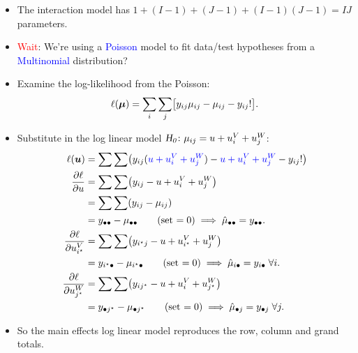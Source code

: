 \documentclass[oneside]{book}\usepackage[]{graphicx}\usepackage[svgnames]{xcolor}
\let\exp\relax%
\let\log\relax%
\newcommand{\HN}{\textsl{H}_{\textsl{0}}}%
\providecommand{\Vector}[1]{\bm{#1}}%
\begin{document}
\begin{itemize}
      \item The interaction model has $ 1+(I-1)+(J-1)+(I-1)(J-1)=IJ $ parameters.
      \item \textcolor{Red}{Wait}: We're using a \textcolor{Blue}{Poisson} model to fit data/test hypotheses from a \textcolor{Blue}{Multinomial} distribution?
      \item Examine the log-likelihood from the Poisson:
            \[ \ell(\Vector{\mu})=\sum_i\sum_j\bigl[y_{ij}\log{\mu_{ij}}-\mu_{ij}-\log{y_{ij}!}\bigr]. \]
      \item Substitute in the log linear model \textcolor{Blue}{$ \HN\colon \log{\mu_{ij}}=u+u_i^V+u_j^W $}:
            \begin{align*}
                  \ell(\Vector{u})
                                & =\sum\sum\bigl(y_{ij}(\textcolor{Blue}{u+u_i^V+u_j^W})-\exp{\textcolor{Blue}{u+u_i^V+u_j^W}}-\log{y_{ij}!}\bigr)          \\
                  \pdv{\ell}{u} & =\sum\sum\bigl(y_{ij}-\exp{u+u_i^V+u_j^W}\bigr)                                                                           \\
                                & =\sum\sum(y_{ij}-\mu_{ij})                                                                                                \\
                                & =y_{\bullet\bullet}-\mu_{\bullet\bullet}\qquad \text{(set $=0$)}\implies \hat{\mu}_{\bullet\bullet}=y_{\bullet\bullet}.   \\
                  \pdv{\ell}{u_{i^\star}^V}
                                & =\sum\sum\bigl(y_{i^\star j}-\exp{u+u_{i^\star}^V+u_j^W}\bigr)                                                            \\
                                & =y_{i^\star\bullet}-\mu_{i^\star\bullet}\qquad \text{(set $=0$)}\implies\hat{\mu}_{i\bullet}=y_{i\bullet}\;\forall i.     \\
                  \pdv{\ell}{u_{j^\star}^W}
                                & =\sum\sum\bigl(y_{ij^\star}-\exp{u+u_{i}^V+u_{j^\star}^W}\bigr)                                                           \\
                                & =y_{\bullet j^\star}-\mu_{\bullet j^\star}\qquad \text{(set $=0$)}\implies\hat{\mu}_{\bullet j}=y_{\bullet j}\;\forall j.
            \end{align*}
      \item So the main effects log linear model reproduces the row, column and grand totals.

\end{itemize}
\end{document}
